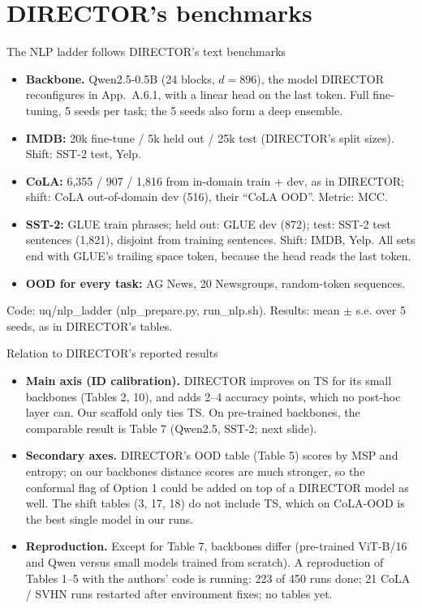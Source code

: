 \documentclass[aspectratio=169,11pt]{beamer}
\newcommand{\source}[1]{\par\vfill{\scriptsize\color{inkgrey}#1}}
\begin{document}
\section{DIRECTOR's benchmarks}

\begin{frame}{The NLP ladder follows DIRECTOR's text benchmarks}
  \small
  \begin{itemize}
    \item \textbf{Backbone.} Qwen2.5-0.5B (24 blocks, $d=896$), the model DIRECTOR reconfigures in App.~A.6.1, with a linear head on the last token. Full fine-tuning, 5 seeds per task; the 5 seeds also form a deep ensemble.
    \item \textbf{IMDB:} 20k fine-tune / 5k held out / 25k test (DIRECTOR's split sizes). Shift: SST-2 test, Yelp.
    \item \textbf{CoLA:} 6,355 / 907 / 1,816 from in-domain train + dev, as in DIRECTOR; shift: CoLA out-of-domain dev (516), their ``CoLA OOD''. Metric: MCC.
    \item \textbf{SST-2:} GLUE train phrases; held out: GLUE dev (872); test: SST-2 test sentences (1,821), disjoint from training sentences. Shift: IMDB, Yelp. All sets end with GLUE's trailing space token, because the head reads the last token.
    \item \textbf{OOD for every task:} AG News, 20 Newsgroups, random-token sequences.
  \end{itemize}
  \source{Code: uq/nlp\_ladder (nlp\_prepare.py, run\_nlp.sh). Results: mean $\pm$ s.e. over 5 seeds, as in DIRECTOR's tables.}
\end{frame}

\begin{frame}{Relation to DIRECTOR's reported results}
  \small
  \begin{itemize}
    \item \textbf{Main axis (ID calibration).} DIRECTOR improves on TS for its small backbones (Tables 2, 10), and adds 2--4 accuracy points, which no post-hoc layer can. Our scaffold only ties TS. On pre-trained backbones, the comparable result is Table 7 (Qwen2.5, SST-2; next slide).
    \item \textbf{Secondary axes.} DIRECTOR's OOD table (Table 5) scores by MSP and entropy; on our backbones distance scores are much stronger, so the conformal flag of Option 1 could be added on top of a DIRECTOR model as well. The shift tables (3, 17, 18) do not include TS, which on CoLA-OOD is the best single model in our runs.
    \item \textbf{Reproduction.} Except for Table 7, backbones differ (pre-trained ViT-B/16 and Qwen versus small models trained from scratch). A reproduction of Tables 1--5 with the authors' code is running: 223 of 450 runs done; 21 CoLA / SVHN runs restarted after environment fixes; no tables yet.
  \end{itemize}
\end{frame}
\end{document}
